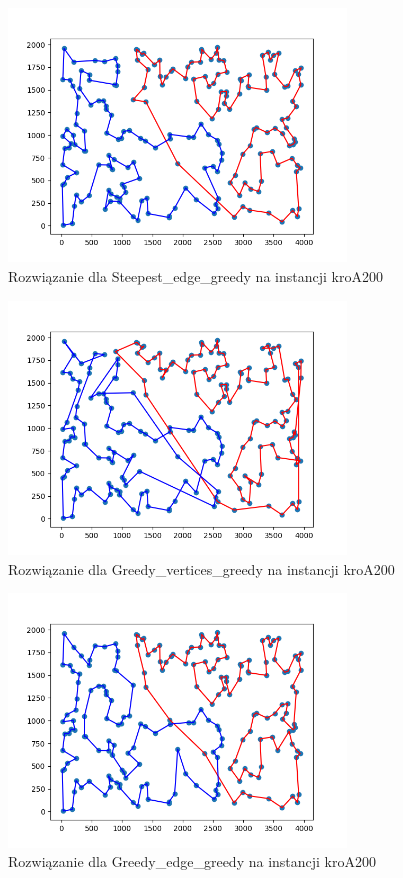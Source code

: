 \documentclass[12pt,a4paper]{article}
\begin{document}
\begin{figure}[H]
\centering
\includegraphics[width=0.8\textwidth]{figures/kroA_Steepest_E_greedy.png}
\caption{Rozwiązanie dla Steepest\_edge\_greedy na instancji kroA200}
\end{figure}

\begin{figure}[H]
\centering
\includegraphics[width=0.8\textwidth]{figures/kroA_Greedy_V_greedy.png}
\caption{Rozwiązanie dla Greedy\_vertices\_greedy na instancji kroA200}
\end{figure}

\begin{figure}[H]
\centering
\includegraphics[width=0.8\textwidth]{figures/kroA_Greedy_E_greedy.png}
\caption{Rozwiązanie dla Greedy\_edge\_greedy na instancji kroA200}
\end{figure}
\end{document}
